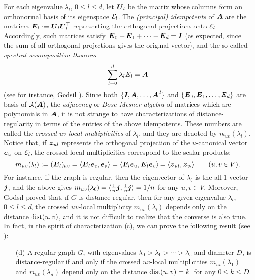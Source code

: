 \documentclass[11pt]{article}
\def\A{\mbox{\boldmath $A$}}
\def\E{\mbox{\boldmath $E$}}
\def\I{\mbox{\boldmath $I$}}
\def\U{\mbox{\boldmath $U$}}
\def\dist{\mathop{\rm dist}\nolimits}
\def\e{\mbox{\boldmath $e$}}
\def\j{\mbox{\boldmath $j$}}
\def\z{\mbox{\boldmath $z$}}
\begin{document}
For each eigenvalue $\lambda_l$, $0\le l\le d$, let $\U_l$ be the
matrix whose columns form an orthonormal basis of its eigenspace
${\cal E}_l$. The {\it (principal) idempotents} of $\A$ are
the matrices $\E_l:=\U_l\U_l^\top$  representing the orthogonal
projections onto  ${\cal E}_l$. Accordingly, such matrices
satisfy  $\E_0+\E_1+\cdots +\E_d=\I$ (as expected, since the sum of
all orthogonal projections gives the original vector), and  the
so-called {\it spectral decomposition theorem}
$$
\sum_{l=0}^d \lambda_l\E_l=\A
$$
(see for instance, Godsil \cite{g93}).
Since both $\{\I,\A,\ldots,\A^d\}$ and 
$\{\E_0,\E_1,\ldots,\E_d\}$ are basis of ${\cal A}(\A)$, the {\it
adjacency\/} or {\it Bose-Mesner algebra} of  matrices
which are polynomials in $\A$, it is not strange to have
characterizations of distance-regularity in terms of the entries of
the above idempotents. These numbers are called the {\it
crossed $uv$-local multiplicities} of  $\lambda_l$, and  they
are denoted by $m_{uv}(\lambda_l)$. Notice that, if $\z_{ul}$
represents the orthogonal projection of the $u$-canonical vector
$\e_u$ on ${\cal E}_l$, the crossed local multiplicities correspond
to the scalar products:
$$
m_{uv}(\lambda_l):=(\E_l)_{uv}
=\langle \E_l\e_u,\e_v\rangle=\langle
\E_l\e_u,\E_l\e_v\rangle=\langle\z_{ul},\z_{vl}\rangle
\qquad (u,v\in V).
$$
For instance, if the graph is regular, then the eigenvector
of $\lambda_0$ is the all-$1$ vector $\j$, and the above gives
$m_{uv}(\lambda_0)=\langle\frac{1}{n}\j,
\frac{1}{n}\j\rangle =1/n$ for any $u,v\in V$.
Moreover,  Godsil \cite{g88} proved that, if $G$ is distance-regular,
then for any given eigenvalue $\lambda_l$, $0\le l\le d$, the crossed
$uv$-local multiplicity $m_{uv}(\lambda_l)$  depends only on the
distance $\dist(u,v)$, and it is not difficult to realize that the
converse is also true. In fact, in the spirit of characterization (c),
we can prove the following result (see \cite{f99}):
\begin{itemize}
\item[(d)]
A regular graph $G$, with eigenvalues
$\lambda_0>\lambda_1>\cdots>\lambda_d$ and diameter
$D$, is distance-regular if and only if the crossed $uv$-local
multiplicities 
$m_{uv}(\lambda_1)$ and $m_{uv}(\lambda_d)$  depend only on the
distance
$\dist(u,v)=k$, for any $0\le k\le D$.
\end{itemize}
\end{document}
